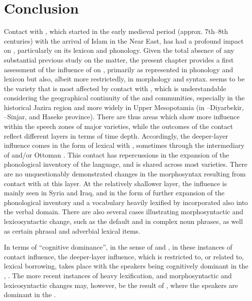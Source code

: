 \documentclass[output=paper]{langsci/langscibook}
\begin{document}
\section{Conclusion}
Contact with , which started in the early medieval period (approx. 7th–8th centuries) with the arrival of Islam in the Near East, has had a profound impact on , particularly on its lexicon and phonology. Given the total absence of any substantial previous study on the matter, the present chapter provides a first assessment of the influence of  on , primarily as represented in  phonology and lexicon but also, albeit more restrictedly, in morphology and syntax.   seems to be the variety that is most affected by contact with , which is understandable considering the geographical continuity of the  and  communities, especially in the historical Jazira region and more widely in Upper Mesopotamia (in –Diyarbekir, –Sinjar, and Haseke province). There are thus areas which show more   influence within the speech zones of major  varieties, while the outcomes of the contact reflect different layers in terms of time depth. Accordingly, the deeper-layer influence comes in the form of lexical  with , sometimes through the intermediary of  and/or Ottoman . This contact has repercussions in the expansion of the phonological inventory of the language, and is shared across most  varieties. There are no unquestionably demonstrated changes in the morphosyntax resulting from contact with  at this layer. At the relatively shallower layer, the influence is mainly seen in Syria and Iraq, and in the form of further expansion of the phonological inventory and a vocabulary heavily lexified by   incorporated also into the verbal domain. There are also several cases illustrating morphosyntactic and lexicosyntactic change, such as the default  and  in complex noun phrases, as well as certain phrasal and adverbial lexical items. 

In terms of “cognitive dominance”, in the sense of \citet{VanCoetsem1988,VanCoetsem2000} and \citet{Lucas2015}, in these instances of contact influence, the deeper-layer influence, which is restricted to, or related to, lexical borrowing, takes place with the speakers being cognitively dominant in the , . The more recent instances of heavy lexification, and morphosyntactic and lexicosyntactic changes may, however, be the result of , where the speakers are dominant in the . 
\end{document}
